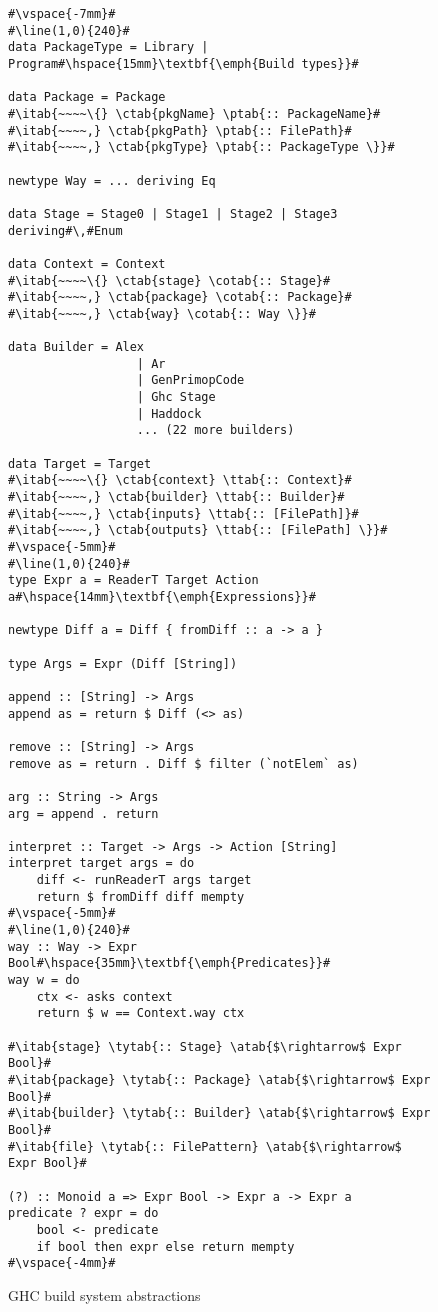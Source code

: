 \begin{figure}
\begin{lstlisting}
#\vspace{-7mm}#
#\line(1,0){240}#
data PackageType = Library | Program#\hspace{15mm}\textbf{\emph{Build types}}#

data Package = Package
#\itab{~~~~\{} \ctab{pkgName} \ptab{:: PackageName}#
#\itab{~~~~,} \ctab{pkgPath} \ptab{:: FilePath}#
#\itab{~~~~,} \ctab{pkgType} \ptab{:: PackageType \}}#

newtype Way = ... deriving Eq

data Stage = Stage0 | Stage1 | Stage2 | Stage3 deriving#\,#Enum

data Context = Context
#\itab{~~~~\{} \ctab{stage} \cotab{:: Stage}#
#\itab{~~~~,} \ctab{package} \cotab{:: Package}#
#\itab{~~~~,} \ctab{way} \cotab{:: Way \}}#

data Builder = Alex
                  | Ar
                  | GenPrimopCode
                  | Ghc Stage
                  | Haddock
                  ... (22 more builders)

data Target = Target
#\itab{~~~~\{} \ctab{context} \ttab{:: Context}#
#\itab{~~~~,} \ctab{builder} \ttab{:: Builder}#
#\itab{~~~~,} \ctab{inputs} \ttab{:: [FilePath]}#
#\itab{~~~~,} \ctab{outputs} \ttab{:: [FilePath] \}}#
#\vspace{-5mm}#
#\line(1,0){240}#
type Expr a = ReaderT Target Action a#\hspace{14mm}\textbf{\emph{Expressions}}#

newtype Diff a = Diff { fromDiff :: a -> a }

type Args = Expr (Diff [String])

append :: [String] -> Args
append as = return $ Diff (<> as)

remove :: [String] -> Args
remove as = return . Diff $ filter (`notElem` as)

arg :: String -> Args
arg = append . return

interpret :: Target -> Args -> Action [String]
interpret target args = do
    diff <- runReaderT args target
    return $ fromDiff diff mempty
#\vspace{-5mm}#
#\line(1,0){240}#
way :: Way -> Expr Bool#\hspace{35mm}\textbf{\emph{Predicates}}#
way w = do
    ctx <- asks context
    return $ w == Context.way ctx

#\itab{stage} \tytab{:: Stage} \atab{$\rightarrow$ Expr Bool}#
#\itab{package} \tytab{:: Package} \atab{$\rightarrow$ Expr Bool}#
#\itab{builder} \tytab{:: Builder} \atab{$\rightarrow$ Expr Bool}#
#\itab{file} \tytab{:: FilePattern} \atab{$\rightarrow$ Expr Bool}#

(?) :: Monoid a => Expr Bool -> Expr a -> Expr a
predicate ? expr = do
    bool <- predicate
    if bool then expr else return mempty
#\vspace{-4mm}#
\end{lstlisting}
\caption{GHC build system abstractions\label{fig:abstractions}}
\end{figure}

